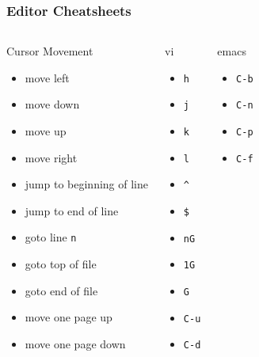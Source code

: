 \documentclass[slidestop,mathserif,compress,xcolor=svgnames]{beamer}
\newenvironment{eblock}[0]
{
\begin{beamerboxesrounded}[upper=uppercol2,lower=lowercol2,shadow=true]}
{\end{beamerboxesrounded}}
\begin{document}
\begin{frame}[allowframebreaks]
  \frametitle{\small Editor Cheatsheets}
  \vspace{-0.6cm}
  {\scriptsize
  \begin{columns}
    \begin{eblock}{Cursor Movement}
    \begin{itemize}
      \item move left 
      \item move down
      \item move up
      \item move right
      \item jump to beginning of line
      \item jump to end of line
      \item goto line \texttt{n}
      \item goto top of file
      \item goto end of file
      \item move one page up
      \item move one page down
    \end{itemize}
    \end{eblock}
    \begin{eblock}{vi}
    \begin{itemize}
      \item \texttt{h}
      \item \texttt{j}
      \item \texttt{k}
      \item \texttt{l}
      \item \texttt{\^}
      \item \texttt{\$}
      \item \texttt{nG}
      \item \texttt{1G}
      \item \texttt{G}
      \item \texttt{C-u}
      \item \texttt{C-d}
    \end{itemize}
    \end{eblock}
    \begin{eblock}{emacs}
    \begin{itemize}
      \item \texttt{C-b}
      \item \texttt{C-n}
      \item \texttt{C-p}
      \item \texttt{C-f}

\end{itemize}
\end{eblock}
\end{columns}}
\end{frame}
\end{document}
